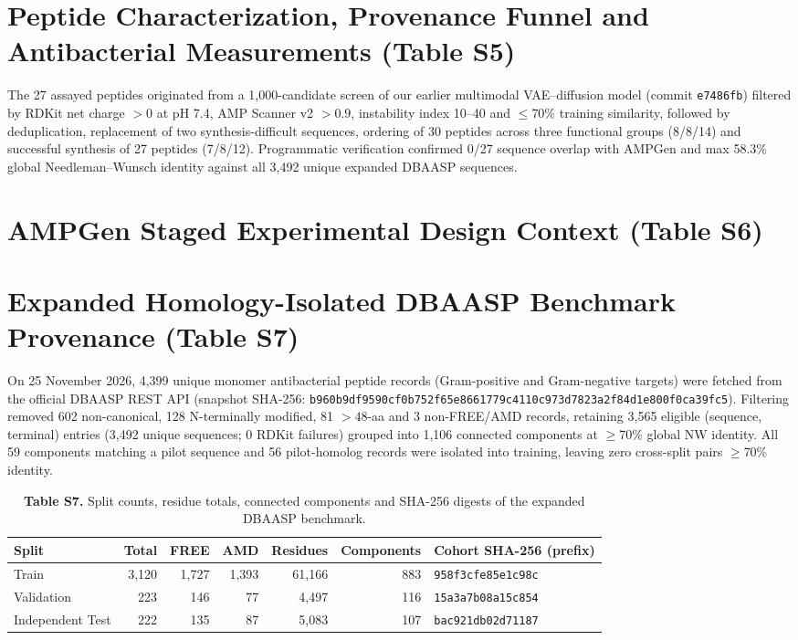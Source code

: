 \documentclass[11pt,a4paper]{article}
\newcommand{\rev}[1]{#1}
\begin{document}
\section{Peptide Characterization, Provenance Funnel and Antibacterial Measurements (Table S5)}
\rev{The 27 assayed peptides originated from a 1,000-candidate screen of our earlier multimodal VAE--diffusion model (commit \texttt{e7486fb}) filtered by RDKit net charge $>0$ at pH 7.4, AMP Scanner v2 $>0.9$, instability index 10--40 and $\leq$70\% training similarity, followed by deduplication, replacement of two synthesis-difficult sequences, ordering of 30 peptides across three functional groups (8/8/14) and successful synthesis of 27 peptides (7/8/12). Programmatic verification confirmed 0/27 sequence overlap with AMPGen \cite{ref9} and max 58.3\% global Needleman--Wunsch identity against all 3,492 unique expanded DBAASP sequences.}


\section{AMPGen Staged Experimental Design Context (Table S6)}


\FloatBarrier
\section{\rev{Expanded Homology-Isolated DBAASP Benchmark Provenance (Table S7)}}
\rev{On 25 November 2026, 4,399 unique monomer antibacterial peptide records (Gram-positive and Gram-negative targets) were fetched from the official DBAASP REST API (snapshot SHA-256: \texttt{b960b9df9590cf0b752f65e8661779c4110c973d7823a2f84d1e800f0ca39fc5}). Filtering removed 602 non-canonical, 128 N-terminally modified, 81 $>48$-aa and 3 non-FREE/AMD records, retaining 3,565 eligible (sequence, terminal) entries (3,492 unique sequences; 0 RDKit failures) grouped into 1,106 connected components at $\geq$70\% global NW identity. All 59 components matching a pilot sequence and 56 pilot-homolog records were isolated into training, leaving zero cross-split pairs $\geq$70\% identity.}

\begin{table}[H]
\centering\footnotesize
\caption*{\rev{\textbf{Table S7.} Split counts, residue totals, connected components and SHA-256 digests of the expanded DBAASP benchmark.}}
\begin{tabular}{lrrrrrl}
\toprule
Split & Total & FREE & AMD & Residues & Components & Cohort SHA-256 (prefix) \\
\midrule
Train & 3,120 & 1,727 & 1,393 & 61,166 & 883 & \texttt{958f3cfe85e1c98c} \\
Validation & 223 & 146 & 77 & 4,497 & 116 & \texttt{15a3a7b08a15c854} \\
Independent Test & 222 & 135 & 87 & 5,083 & 107 & \texttt{bac921db02d71187} \\
\bottomrule
\end{tabular}
\end{table}
\end{document}
